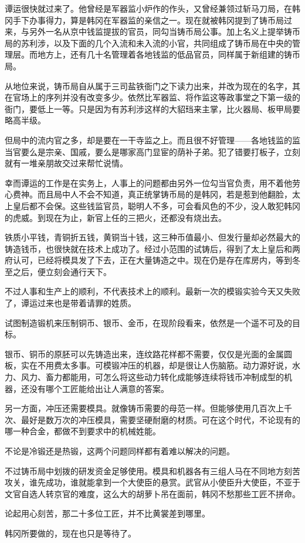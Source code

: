 谭运很快就过来了。他曾经是军器监小炉作的作头，又曾经兼领过斩马刀局，在韩冈手下办事得力，算是韩冈在军器监的亲信之一。现在就被韩冈提到了铸币局过来，与另外一名从京中钱监提拔的官员，同勾当铸币局公事。加上名义上提举铸币局的苏利涉，以及下面的几个入流和未入流的小官，共同组成了铸币局在中央的管理层。而地方上，还有几十名管理着各地钱监的低品官员，同样属于新组建的铸币局。

从地位来说，铸币局自从属于三司盐铁衙门之下读力出来，并改为现在的名字，其在官场上的序列并没有改变多少。依然比军器监、将作监这等政事堂之下第一级的衙门，要低上一等。只是因为有苏利涉这样的大貂珰来主掌，比火器局、板甲局要略高半级。

但局中的流内官之多，却是要在一干寺监之上。而且很不好管理——各地钱监的监当官要么是宗亲、国戚，要么是哪家高门显宦的荫补子弟。犯了错要打板子，立刻就有一堆亲朋故交过来帮忙说情。

幸而谭运的工作是在实务上，人事上的问题都由另外一位勾当官负责，用不着他劳心费神。而且局中人不会不知道，真正统掌铸币局的是韩冈，若是惹到他翻脸，太上皇后都不会保。这些钱监官员，聪明人不多，可会看风色的不少，没人敢犯韩冈的虎威。到现在为止，新官上任的三把火，还都没有烧出去。

铁质小平钱，青铜折五钱，黄铜当十钱，这三种币值最小、但发行量却必然最大的铸造钱币，也很快就在技术上成功了。经过小范围的试铸后，得到了太上皇后和两府认可，已经将模具发了下去，正在大量铸造之中。现在仍是存在库房内，等到冬至之后，便立刻会通行天下。

不过人事和生产上的顺利，不代表技术上的顺利。最新一次的模锻实验今天又失败了，谭运过来也是带着请罪的姓质。

试图制造锻机来压制铜币、银币、金币，在现阶段看来，依然是一个遥不可及的目标。

银币、铜币的原胚可以先铸造出来，连纹路花样都不需要，仅仅是光面的金属圆板，实在不用费太多事。可模锻冲压的机器，却是很让人伤脑筋。动力源好说，水力、风力、畜力都能用，可怎么将这些动力转化成能够连续将钱币冲制成型的机器，还没有哪个工匠能给出让人满意的答案。

另一方面，冲压还需要模具。就像铸币需要的母范一样。但能够使用几百次上千次、最好是数万次的冲压模具，需要坚硬耐磨的材质。可在这个时代，不论现有的哪一种合金，都做不到要求中的机械姓能。

不论是冷锻还是热锻，这两个问题同样都有着难以解决的问题。

不过铸币局中划拨的研发资金足够使用。模具和机器各有三组人马在不同地方刻苦攻关，谁先成功，谁就能拿到一个大使臣的悬赏。武官从小使臣升大使臣，不亚于文官自选人转京官的难度，这么大的胡萝卜吊在面前，韩冈不愁那些工匠不拼命。

论起用心刻苦，那二十多位工匠，并不比黄裳差到哪里。

韩冈所要做的，现在也只是等待了。

